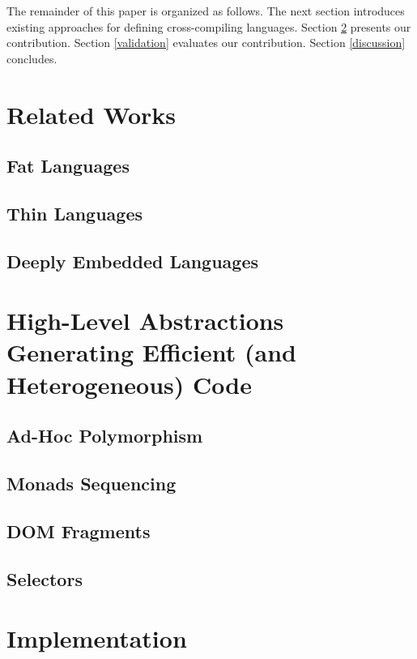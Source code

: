 \documentclass[preprint]{sigplanconf}
\begin{document}
The remainder of this paper is organized as follows. The next section introduces existing approaches for defining
cross-compiling languages. Section \ref{contribution} presents our contribution. Section \ref{validation} evaluates
our contribution. Section \ref{discussion} concludes.

\section{Related Works}

\subsection{Fat Languages}

\subsection{Thin Languages}

\subsection{Deeply Embedded Languages}

\section{High-Level Abstractions Generating Efficient (and Heterogeneous) Code}
\label{contribution}

\subsection{Ad-Hoc Polymorphism}

\subsection{Monads Sequencing}

\subsection{DOM Fragments}

\subsection{Selectors}

\section{Implementation}
\end{document}
